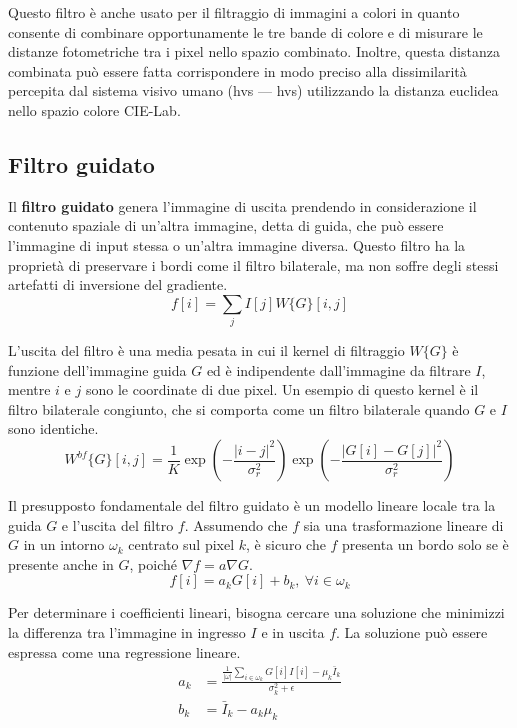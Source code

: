 \documentclass[../main.tex]{subfiles}
\begin{document}
	Questo filtro è anche usato per il filtraggio di immagini a colori in quanto consente di combinare opportunamente le tre bande di colore e di misurare le distanze fotometriche tra i pixel nello spazio combinato. Inoltre, questa distanza combinata può essere fatta corrispondere in modo preciso alla dissimilarità percepita dal sistema visivo umano (\acrlong{hvs} --- \acrshort{hvs}) utilizzando la distanza euclidea nello spazio colore CIE-Lab.\cite{wyszecki_2000}
	
	\subsection{Filtro guidato}
	
	Il \textbf{filtro guidato} genera l'immagine di uscita prendendo in considerazione il contenuto spaziale di un'altra immagine, detta di guida, che può essere l'immagine di input stessa o un'altra immagine diversa. Questo filtro ha la proprietà di preservare i bordi come il filtro bilaterale, ma non soffre degli stessi artefatti di inversione del gradiente\cite{durand_2002}.
	\begin{equation}
		f[i] = \sum_{j}I[j]W\{G\}[i,j]
	\end{equation}
	
	L'uscita del filtro è una media pesata in cui il kernel di filtraggio $W\{G\}$ è funzione dell'immagine guida $G$ ed è indipendente dall'immagine da filtrare $I$, mentre $i$ e $j$ sono le coordinate di due pixel. Un esempio di questo kernel è il filtro bilaterale congiunto, che si comporta come un filtro bilaterale quando $G$ e $I$ sono identiche.\cite{petschnigg_2004}
	\begin{equation}
		W^{bf}\{G\}[i,j] = \frac{1}{K} \exp\left(-\frac{|i-j|^2}{\sigma^2_r}\right) \exp\left(-\frac{|G[i]-G[j]|^2}{\sigma_r^2}\right)
	\end{equation} 
	
	Il presupposto fondamentale del filtro guidato è un modello lineare locale tra la guida $G$ e l'uscita del filtro $f$. Assumendo che $f$ sia una trasformazione lineare di $G$ in un intorno $\omega_k$ centrato sul pixel $k$, è sicuro che $f$ presenta un bordo solo se è presente anche in $G$, poiché $\nabla f = a\nabla G$\cite{he_2013}.
	\begin{equation}
		f[i] = a_kG[i]+b_k,\ \forall i\in\omega_k
	\end{equation}
	
	Per determinare i coefficienti lineari, bisogna cercare una soluzione che minimizzi la differenza tra l'immagine in ingresso $I$ e in uscita $f$. La soluzione può essere espressa come una regressione lineare.
	\begin{align}
		a_k &= \frac{\frac{1}{|\omega|}\sum_{i\in\omega_k}G[i]I[i]-\mu_k\bar{I}_k}{\sigma_k^2+\epsilon}\\
		b_k &= \bar{I}_k-a_k\mu_k
	\end{align}
	
\end{document}
